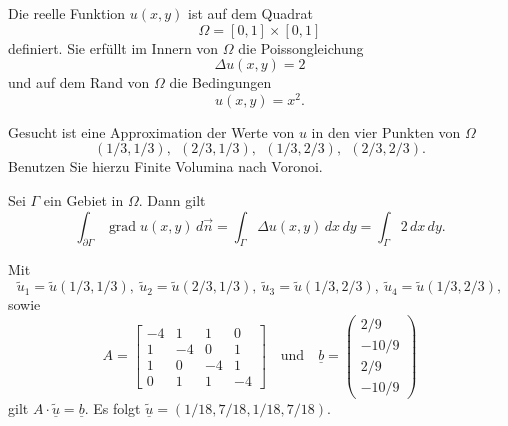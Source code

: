 Die reelle Funktion $u(x,y)$ ist auf dem Quadrat
\[
\Omega = [0, 1] \times [0,1]
\]
definiert.
Sie erfüllt im Innern von $\Omega$ die Poissongleichung
\[
\Delta u(x,y) = 2
\]
und auf dem Rand von $\Omega$ die Bedingungen
\[
u(x,y) = x^2.
\]

Gesucht ist eine Approximation der Werte von $u$ in den vier Punkten von
$\Omega$
\[
(1/3,1/3), \ \  (2/3,1/3), \ \ (1/3,2/3), \ \  (2/3,2/3).
\]
Benutzen Sie hierzu Finite Volumina nach Voronoi.  

\begin{hinweis}
Sei $\Gamma$ ein Gebiet in $\Omega$.
Dann gilt
\[
\int_{\partial \Gamma} \operatorname{grad} u(x,y) \,d\vec n
=
\int_{\Gamma} \Delta u(x,y) \,dx\,dy
=
\int_{\Gamma} 2 \,dx\, dy.
\]
\end{hinweis}


\begin{loesung}
Mit 
\[
\tilde u_1 = \tilde u(1/3,1/3),
\ \tilde u_2 = \tilde u(2/3,1/3),
\ \tilde u_3 = \tilde u(1/3,2/3),
\ \tilde u_4 = \tilde u(1/3,2/3),
\]
sowie 
\[
A = \left[\begin{array}{rrrr} 
-4 & 1  & 1 & 0 \\
 1 & -4 & 0 & 1 \\
 1 & 0 & -4 & 1 \\ 
 0 & 1 & 1  & -4 \end{array}\right]
\quad\text{und}\quad
\underline{b} =  \left(\begin{array}{r} 2/9 \\ -10/9 \\ 2/9 \\ -10/9 \end{array}\right)
\]
gilt $A \cdot \underline{\tilde u} = \underline{b}.$
Es folgt $\underline{\tilde u} = (1/18, 7/18, 1/18, 7/18).$
\end{loesung}


